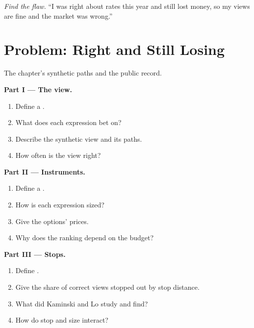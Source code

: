 \begin{exercise}[$\star\star\star$]\label{exo:s2:discretionary-macro:8}
\emph{Find the flaw.} ``I was right about rates this year and still lost money, so my views are fine and the market was wrong.''
\end{exercise}

\section{Problem: Right and Still Losing}

\begin{problem}\label{pb:s2:discretionary-macro:1}
The chapter's synthetic paths and the public record.

\medskip\noindent\textbf{Part I --- The view.}
\begin{enumerate}
\item Define a .
\item What does each expression bet on?
\item Describe the synthetic view and its paths.
\item How often is the view right?
\end{enumerate}

\medskip\noindent\textbf{Part II --- Instruments.}
\begin{enumerate}[resume]
\item Define a .
\item How is each expression sized?
\item Give the options' prices.
\item Why does the ranking depend on the budget?
\end{enumerate}

\medskip\noindent\textbf{Part III --- Stops.}
\begin{enumerate}[resume]
\item Define .
\item Give the share of correct views stopped out by stop distance.
\item What did Kaminski and Lo study and find?
\item How do stop and size interact?
\end{enumerate}


\end{problem}

